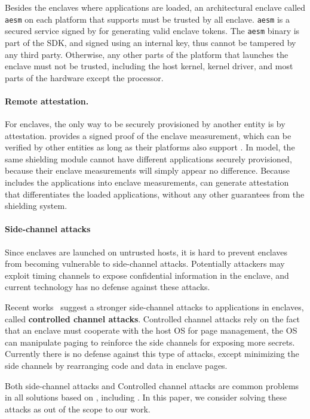 Besides the enclaves where applications are loaded,
an architectural enclave called {\tt aesm} on each platform that supports \sgx{}
must be trusted by all enclave.
{\tt aesm} is a secured service signed by \intel{} for generating
valid enclave tokens.
The {\tt aesm} binary is part of the \sgx{} SDK,
and signed using an \intel{} internal key, thus cannot be
tampered by any third party.
Otherwise, any other parts of the platform that launches the enclave
must not be trusted, including the host kernel,
\sgx{} kernel driver, and most parts of the hardware except the processor.

\paragraph{Remote attestation.}
For enclaves, the only way to be securely provisioned by another entity
is by attestation.
\sgx{} provides a signed proof of the enclave measurement,
which can be verified by other entities as long as their platforms
also support \sgx{}.
In \haven{} model, the same shielding module cannot have different applications
securely provisioned, because their enclave measurements will simply
appear no difference.
Because \sysname{} includes the applications into enclave measurements,
\sgx{} can generate attestation that differentiates the loaded applications,
without any other guarantees from the shielding system.

\paragraph{Side-channel attacks}
Since enclaves are launched on untrusted hosts, it is hard to prevent
enclaves from becoming vulnerable to side-channel attacks.
Potentially attackers may exploit timing channels to expose confidential
information in the enclave, and current \sgx{} technology has no defense
against these attacks.

Recent works~\citep{xu15controlledchannel} suggest a stronger
side-channel attacks to applications in enclaves,
called {\bf controlled channel attacks}.
Controlled channel attacks rely on the fact that an enclave must cooperate
with the host OS for page management,
the OS can manipulate paging to reinforce the side channels
for exposing more secrets.
Currently there is no defense against this type of attacks, except minimizing
the side channels by rearranging code and data in enclave pages.

Both side-channel attacks and Controlled channel attacks
are common problems in all solutions based on \sgx{},
including \haven{}. In this paper, we consider solving these attacks as
out of the scope to our work.

